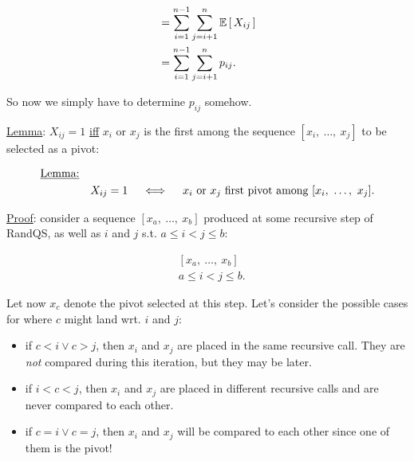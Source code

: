 \begin{enumerate}
    \begin{textred}
      \begin{align}
         &= \sum_{i = 1}^{n - 1}\sum_{j = i + 1}^n \mathbb E\left[\, X_{ij}\, \right]\\
         &= \sum_{i = 1}^{n - 1}\sum_{j = i + 1}^n p_{ij}.
      \end{align}
    \end{textred}

    So now we simply have to determine $p_{ij}$ somehow.

    \underline{Lemma}: $X_{ij} = 1$ \underline{iff} $x_i$ or $x_j$ is the first
    among the sequence $[x_i,\ \dots,\ x_j]$ to be selected as a pivot:

    \begin{textred}
      \begin{align}
        \text{\underline{Lemma:}}\quad&\nonumber\\
        &X_{ij} = 1\quad \iff \quad x_i \text{ or } x_j
        \text{ first pivot among } [x_i,\ \dots,\ x_j].
      \end{align}
    \end{textred}

    \underline{Proof}: consider a sequence $[x_a,\ \dots,\ x_b]$ produced at
    some recursive step of RandQS, as well as $i$ and $j$ s.t. $a \leq i < j
    \leq b$:

    \begin{textred}
      \begin{align}
        &[x_a,\ \dots,\ x_b]\\
        &a \leq i < j \leq b.
      \end{align}
    \end{textred}

    Let now $x_c$ denote the pivot selected at this step. Let's consider the
    possible cases for where $c$ might land wrt. $i$ and $j$:

    \begin{itemize}
      \item if $c < i \lor c > j$, then $x_i$ and $x_j$ are placed in the same recursive
        call. They are \emph{not} compared during this iteration, but they may be later.

      \item if $i < c < j$, then $x_i$ and $x_j$ are placed in different recursive calls
        and are never compared to each other.

      \item if $c = i \lor c = j$, then $x_i$ and $x_j$ will be compared to each other
        since one of them is the pivot!
    \end{itemize}


\end{enumerate}
